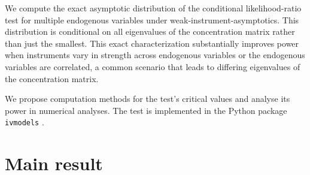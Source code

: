 \documentclass[11pt,hidelinks,a4paper]{article}
\begin{document}
We compute the exact asymptotic distribution of the conditional likelihood-ratio test for multiple endogenous variables under weak-instrument-asymptotics.
This distribution is conditional on all eigenvalues of the concentration matrix rather than just the smallest.
This exact characterization substantially improves power when instruments vary in strength across endogenous variables or the endogenous variables are correlated, a common scenario that leads to differing eigenvalues of the concentration matrix.

We propose computation methods for the test's critical values and analyse its power in numerical analyses.
The test is implemented in the Python package \texttt{ivmodels} \citep{londschien2024weak,londschien2025statistician}.

\section{Main result}
\end{document}
